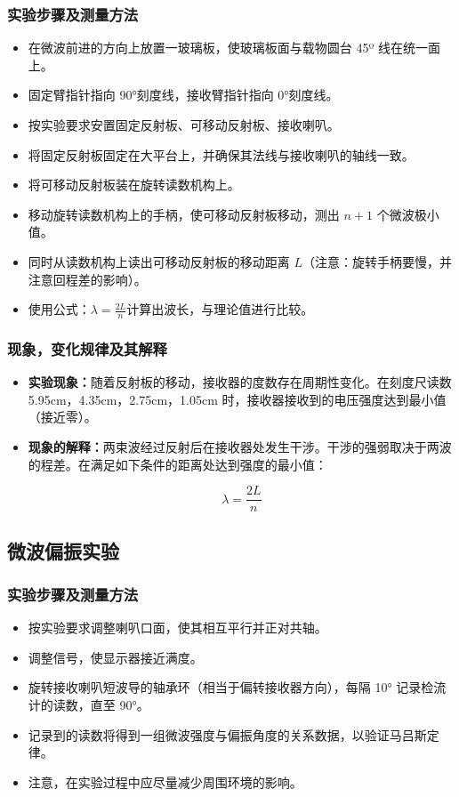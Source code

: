 \documentclass[zihao=5, UTF8]{article}
\theoremstyle{MyLineTheoremStyle} %
\theoremstyle{MyBlockTheoremStyle} %
\theoremstyle{MySubsubsectionStyle} %
\begin{document}
\subsubsection{实验步骤及测量方法}
\begin{itemize}
    \item 在微波前进的方向上放置一玻璃板，使玻璃板面与载物圆台 45º 线在统一面上。
    \item 固定臂指针指向 90°刻度线，接收臂指针指向 0°刻度线。
    \item 按实验要求安置固定反射板、可移动反射板、接收喇叭。
    \item 将固定反射板固定在大平台上，并确保其法线与接收喇叭的轴线一致。
    \item 将可移动反射板装在旋转读数机构上。
    \item 移动旋转读数机构上的手柄，使可移动反射板移动，测出 $n+1$ 个微波极小值。
    \item 同时从读数机构上读出可移动反射板的移动距离 $L$（注意：旋转手柄要慢，并注意回程差的影响）。
    \item 使用公式：$\lambda = \frac{2L}{n}$计算出波长，与理论值进行比较。
\end{itemize}
\subsubsection{现象，变化规律及其解释}
\begin{itemize}
  \item \textbf{实验现象：}随着反射板的移动，接收器的度数存在周期性变化。在刻度尺读数 5.95cm，4.35cm，2.75cm，1.05cm 时，接收器接收到的电压强度达到最小值（接近零）。
  \item \textbf{现象的解释：}两束波经过反射后在接收器处发生干涉。干涉的强弱取决于两波的程差。在满足如下条件的距离处达到强度的最小值：

\[
\lambda = \frac{2L}{n}
\]

\end{itemize}

\subsection{微波偏振实验}
\subsubsection{实验步骤及测量方法}
\begin{itemize}
    \item 按实验要求调整喇叭口面，使其相互平行并正对共轴。
    \item 调整信号，使显示器接近满度。
    \item 旋转接收喇叭短波导的轴承环（相当于偏转接收器方向），每隔 10° 记录检流计的读数，直至 90°。
    \item 记录到的读数将得到一组微波强度与偏振角度的关系数据，以验证马吕斯定律。
    \item 注意，在实验过程中应尽量减少周围环境的影响。
\end{itemize}
\end{document}
